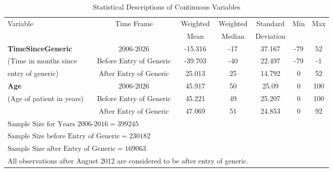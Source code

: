 \begin{table}[htbp]\centering
\def\sym#1{\ifmmode^{#1}\else\(^{#1}\)\fi}
\caption{Statistical Descriptions of Continuous Variables\label{tab1}}
\begin{tabular}{l*{6}{c}}
\hline\hline
            Variable&\multicolumn{1}{c}{Time Frame}&\multicolumn{1}{c}{Weighted}&\multicolumn{1}{c}{Weighted}&\multicolumn{1}{c}{Standard}&\multicolumn{1}{c}{Min}&\multicolumn{1}{c}{Max}\\
            && Mean & Median & Deviation\\
\hline
\textbf{TimeSinceGeneric}                    &     2006-2026&             -15.316&    -17&   37.167&     -79&  52\\
(Time in months since &     Before Entry of Generic&     -39.703&    -40&    22.497 &     -79&  -1\\
entry of generic)   &     After Entry of Generic&       25.013 &    25&      14.792&     0&  52\\
[1em]
\textbf{Age}                                 &     2006-2026&             45.917&    50&    25.09 &     0&  100\\
(Age of patient in years)           &     Before Entry of Generic&     45.221&    49&    25.207&     0&  100\\
                                    &     After Entry of Generic&      47.069&    51&    24.853&     0&  92\\
\hline
\multicolumn{4}{l}{$\text{Sample Size for Years 2006-2016} = 399245$}\\
\multicolumn{4}{l}{$\text{Sample Size before Entry of Generic} = 230182$}\\
\multicolumn{4}{l}{$\text{Sample Size after Entry of Generic} = 169063$}\\
\hline\hline
\multicolumn{4}{l}{\footnotesize All observations after August 2012 are considered to be after entry of generic.}\\
\end{tabular}

\label{tab:Table3.1}
\end{table}
